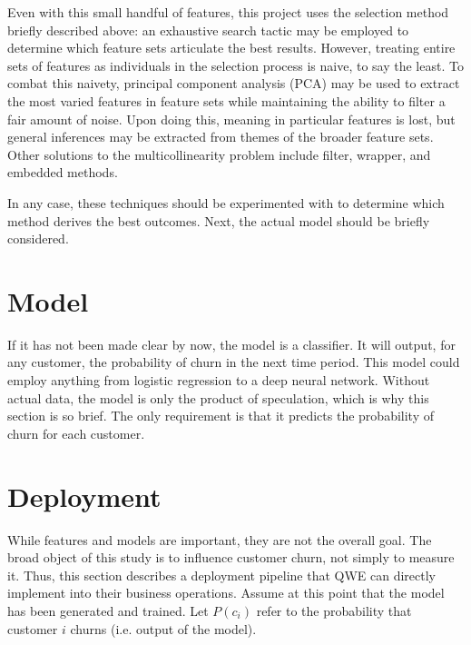 \documentclass{article}
\begin{document}
	Even with this small handful of features, this project uses the selection method briefly described above: an exhaustive search tactic may be employed to determine which feature sets articulate the best results. However, treating entire sets of features as individuals in the selection process is naive, to say the least. To combat this naivety, principal component analysis (PCA) may be used to extract the most varied features in feature sets while maintaining the ability to filter a fair amount of noise. Upon doing this, meaning in particular features is lost, but general inferences may be extracted from themes of the broader feature sets. Other solutions to the multicollinearity problem include filter, wrapper, and embedded methods. 
	
	In any case, these techniques should be experimented with to determine which method derives the best outcomes. Next, the actual model should be briefly considered.
		
	\section{Model}
	
	If it has not been made clear by now, the model is a classifier. It will output, for any customer, the probability of churn in the next time period. This model could employ anything from logistic regression to a deep neural network. Without actual data, the model is only the product of speculation, which is why this section is so brief. The only requirement is that it predicts the probability of churn for each customer.
	
	\section{Deployment}
	
	While features and models are important, they are not the overall goal. The broad object of this study is to influence customer churn, not simply to measure it. Thus, this section describes a deployment pipeline that QWE can directly implement into their business operations. Assume at this point that the model has been generated and trained. Let $P(c_i)$ refer to the probability that customer $i$ churns (i.e. output of the model). 
	
\end{document}
